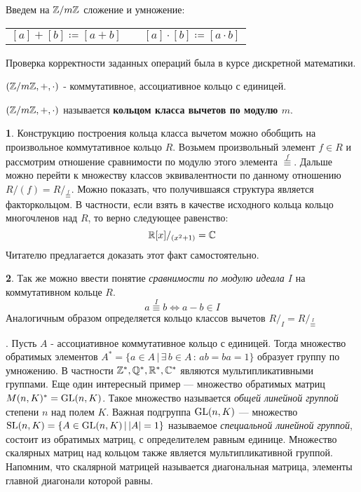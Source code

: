 \documentclass[../main.tex]{subfiles}
\begin{document}
Введем на $\mathbb{Z}/m\mathbb{Z}$ сложение и умножение:

\begin{center}
\begin{tabular}{l p{2.5cm} r}
    $[a] + [b ] \coloneqq [a + b]$ &  & $[a] \cdot [b] \coloneqq [a \cdot b]$
\end{tabular}
\end{center}

Проверка корректности заданных операций была в курсе дискретной математики.
\begin{theorem-non}
    $(\mathbb{Z}/m\mathbb{Z}, +, \cdot)$ - коммутативное, ассоциативное кольцо с единицей.
\end{theorem-non}
\begin{definition}
    $(\mathbb{Z}/m\mathbb{Z}, +, \cdot)$ называется \textbf{кольцом класса вычетов по модулю $m$}.
\end{definition}


\textbf{1}. Конструкцию построения кольца класса вычетом можно обобщить на произвольное коммутативное кольцо $R$. Возьмем произвольный элемент $f \in R$ и рассмотрим отношение сравнимости по модулю этого элемента {\scriptsize${\overset{f}{\equiv}}$}. Дальше можно перейти к множеству классов эквивалентности по данному отношению $R/(f) = R/_{\overset{f}{\equiv}}$. Можно показать, что получившаяся структура является факторкольцом. В частности, если взять в качестве исходного кольца кольцо многочленов над $R$, то верно следующее равенство:
\begin{equation*}
    \mathbb{R}[x]/_{(x^2 + 1)} = \mathbb{C}
\end{equation*}
Читателю предлагается доказать этот факт самостоятельно.
\pagebreak

\textbf{2}. Так же можно ввести понятие \textit{сравнимости по модулю идеала $I$} на коммутативном кольце $R$.
\begin{equation*}
    a \overset{I}{\equiv} b \iff a - b \in I
\end{equation*}
Аналогичным образом определяется кольцо классов вычетов $R/_I = R/_{{\overset{I}{\equiv}}}$

\textbf{}. Пусть $A$ - ассоциативное коммутативное кольцо с единицей. Тогда множество
обратимых элементов \linebreak $A^{*} = \{a \in A \, | \, \exists \, b \in A \, : \, ab = ba =
1\}$ образует группу по умножению. В частности $\mathbb{Z}^{*}, \mathbb{Q}^{*}, \mathbb{R}^{*}, \mathbb{C}^{*}$ являются
мультипликативными группами. Еще один интересный пример --- множество обратимых матриц $M(n, K)^{*
} = \operatorname{GL}(n, K)$. Такое множество называется \textit{общей линейной группой} степени $n$ над полем
$K$. Важная подгруппа $\operatorname{GL}(n, K)$ --- множество $\operatorname{SL}(n, K) = \{A \in \operatorname{GL}(n, K) \, | \, |A| = 1\}$
называемое \textit{специальной линейной группой}, состоит из обратимых матриц, с определителем
равным единице. Множество скалярных матриц над кольцом также является мультипликативной группой.
Напомним, что скалярной матрицей называется диагональная матрица, элементы главной диагонали
которой равны.
\end{document}
